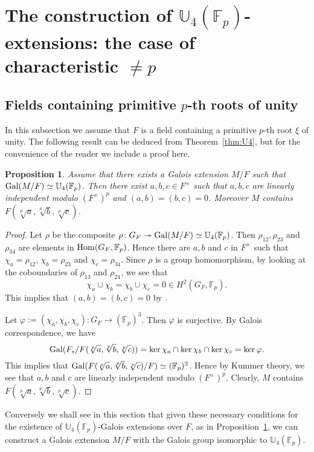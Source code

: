 \documentclass[12pt,leqno]{amsart}
\theoremstyle{plain}
\newtheorem{prop}[thm]{Proposition}
\theoremstyle{definition}
\newcommand{\surj}{\twoheadrightarrow}
\newcommand{\F}{{\mathbb F}}
\newcommand{\U}{{\mathbb U}}
\begin{document}
\section{The construction of $\U_4(\F_p)$-extensions: the case of characteristic $\not=p$}
\subsection{Fields containing primitive $p$-th roots of unity}
\label{subsec:with p-primitive}
In this subsection we assume that $F$ is a field containing a primitive $p$-th root $\xi$ of unity.   
The following result can be deduced from Theorem~\ref{thm:U4}, but for the convenience of the reader we include a proof here.
\begin{prop}
\label{prop:U4 existence}
 Assume that there exists a Galois extension $M/F$ such that ${\rm Gal}(M/F)\simeq \U_4(\F_p)$. Then there exist $a,b,c\in F^\times$ such that $a,b,c$ are  linearly independent modulo $(F^\times)^p$ and $(a,b)=(b,c)=0$. Moreover $M$ contains $F(\sqrt[p]{a},\sqrt[p]{b},\sqrt[p]{c})$. 
\end{prop}
\begin{proof}
 Let $\rho$ be the composite $\rho\colon G_F\surj{\rm Gal}(M/F)\simeq \U_4(\F_p)$. Then $\rho_{12},\rho_{23}$ and $\rho_{34}$ are elements in ${\rm Hom}(G_F,\F_p)$. Hence there are $a,b$ and $c$ in $F^\times$ such that $\chi_a=\rho_{12}$, $\chi_b=\rho_{23}$ and $\chi_c=\rho_{34}$. Since $\rho$ is a group homomorphism, by looking at the coboundaries of $\rho_{13}$ and $\rho_{24}$, we see that 
\[
\chi_a\cup \chi_b =\chi_b\cup\chi_c=0 \in H^2(G_F,\F_p).
\]
 This implies that $(a,b)=(b,c)=0$ by \cite[Chapter XIV, Proposition 5]{Se}.
 
 Let $\varphi:=(\chi_a,\chi_b,\chi_c)\colon G_F\to (\F_p)^3$. Then $\varphi$ is surjective. By Galois correspondence, we  have 
 \[
 {\rm Gal}(F_s/F(\sqrt[p]{a},\sqrt[p]{b},\sqrt[p]{c}))= \ker\chi_a\cap \ker\chi_b\cap\ker\chi_c=\ker\varphi.
 \]
 This implies that ${\rm Gal}(F(\sqrt[p]{a},\sqrt[p]{b},\sqrt[p]{c})/F)\simeq (\F_p)^3$. Hence by Kummer theory, we see that $a,b$ and $c$ are  linearly independent modulo $(F^\times)^p$. Clearly, $M$ contains $F(\sqrt[p]{a},\sqrt[p]{b},\sqrt[p]{c})$. 
\end{proof}

Conversely we shall see in this section that given these necessary conditions  for the existence of $\U_4(\F_p)$-Galois extensions over  $F$, as in Proposition~\ref{prop:U4 existence}, we can construct a Galois extension $M/F$ with the Galois group isomorphic to $\U_4(\F_p)$. 
\end{document}
